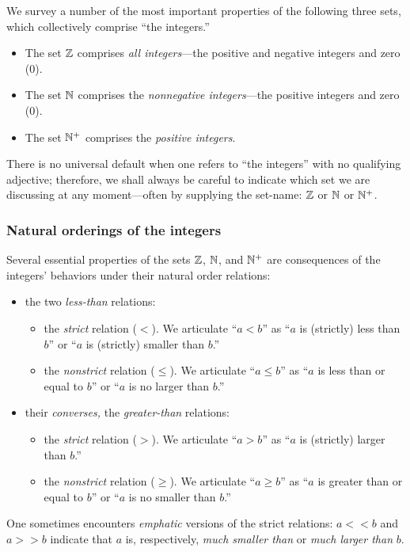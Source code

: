 We survey a number of the most important properties of the following
three sets, which collectively comprise ``the integers.''
\begin{itemize}
\item
The set $\mathbb{Z}$
comprises {\em all integers}---the positive and negative integers and
zero ($0$).
\item
The set $\mathbb{N}$
comprises the {\em nonnegative integers}---the positive integers and
zero ($0$).
\item
The set $\mathbb{N}^+$
comprises the {\em positive integers}.
\end{itemize}
There is no universal default when one refers to ``the integers'' with
no qualifying adjective; therefore, we shall always be careful to
indicate which set we are discussing at any moment---often by
supplying the set-name: $\mathbb{Z}$ or $\mathbb{N}$ or $\mathbb{N}^+$.

\subsubsection{Natural orderings of the integers}
\label{sec:natural-orderings}

Several essential properties of the sets $\mathbb{Z}$, $\mathbb{N}$, and $\mathbb{N}^+$ are
consequences of the integers' behaviors under their natural order
relations:
\begin{itemize}
\item
the two {\em less-than} relations:
  \begin{itemize}
  \item
the {\em strict} relation ($<$).  We articulate ``$a < b$'' as ``$a$
is (strictly) less than $b$'' or ``$a$ is (strictly) smaller than
$b$.''
  \item
the {\em nonstrict} relation ($\leq$).  We articulate ``$a \leq b$''
as ``$a$ is less than or equal to $b$'' or ``$a$ is no larger than
$b$.''
  \end{itemize}
 

\item
their {\em converses,} the {\em greater-than} relations:
  \begin{itemize}
  \item
the {\em strict} relation ($>$).  We articulate ``$a > b$'' as ``$a$
is (strictly) larger than $b$.''
  \item
the {\em nonstrict} relation ($\geq$).  We articulate ``$a \geq b$''
as ``$a$ is greater than or equal to $b$'' or ``$a$ is no smaller than
$b$.''
  \end{itemize}
\end{itemize}
One sometimes encounters {\em emphatic} versions of the strict
relations: $a << b$ and $a >> b$ indicate that $a$ is, respectively,
{\em much smaller than} or {\em much larger than} $b$.

